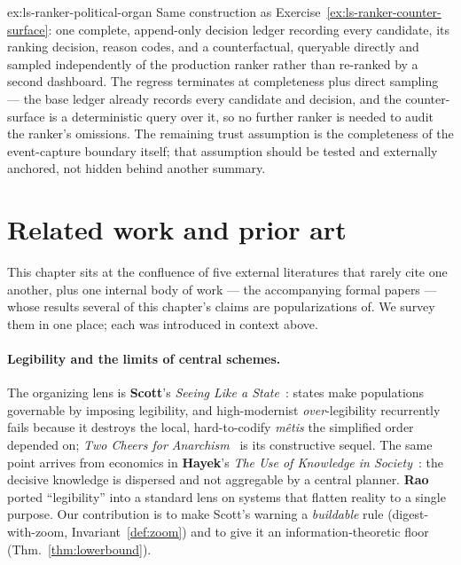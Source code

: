 \documentclass[11pt,a4paper]{article}
\theoremstyle{definition}
\theoremstyle{plain}
\begin{document}
\begin{pdsolution}{ex:ls-ranker-political-organ}
Same construction as Exercise~\ref{ex:ls-ranker-counter-surface}: one complete, append-only decision ledger recording every candidate, its ranking decision, reason codes, and a counterfactual, queryable directly and sampled independently of the production ranker rather than re-ranked by a second dashboard. The regress terminates at completeness plus direct sampling --- the base ledger already records every candidate and decision, and the counter-surface is a deterministic query over it, so no further ranker is needed to audit the ranker's omissions. The remaining trust assumption is the completeness of the event-capture boundary itself; that assumption should be tested and externally anchored, not hidden behind another summary.
\end{pdsolution}

\section{Related work and prior art}\label{sec:related}

This chapter sits at the confluence of five external literatures that rarely cite one
another, plus one internal body of work --- the accompanying formal papers --- whose
results several of this chapter's claims are popularizations of. We survey them in one
place; each was introduced in context above.

\paragraph{Legibility and the limits of central schemes.}
The organizing lens is \textbf{Scott}'s \emph{Seeing Like a State}~:
states make populations governable by imposing legibility, and high-modernist
\emph{over}-legibility recurrently fails because it destroys the local, hard-to-codify
\emph{m\^etis} the simplified order depended on; \emph{Two Cheers for
Anarchism}~ is its constructive sequel. The same point arrives from
economics in \textbf{Hayek}'s \emph{The Use of Knowledge in Society}~:
the decisive knowledge is dispersed and not aggregable by a central planner.
\textbf{Rao}~ ported ``legibility'' into a standard lens on systems that
flatten reality to a single purpose. Our contribution is to make Scott's warning a
\emph{buildable} rule (digest-with-zoom, Invariant~\ref{def:zoom}) and to give it an
information-theoretic floor (Thm.~\ref{thm:lowerbound}).
\end{document}
